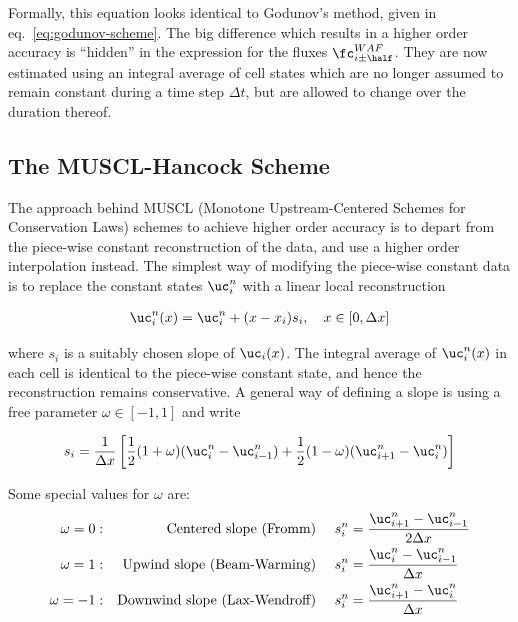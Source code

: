 Formally, this equation looks identical to Godunov's method, given in eq.~\ref{eq:godunov-scheme}.
The big difference which results in a higher order accuracy is ``hidden'' in the expression for the
fluxes $\fc^{WAF}_{i\pm \half}$. They are now estimated using an integral average of cell states
which are no longer assumed to remain constant during a time step $\Delta t$, but are allowed to
change over the duration thereof.






\subsection{The MUSCL-Hancock Scheme}\label{chap:MUSCL-Hancock}


The approach behind MUSCL (Monotone Upstream-Centered Schemes for Conservation Laws) schemes to
achieve higher order accuracy is to depart from the piece-wise constant reconstruction of the data,
and use a higher order interpolation instead. The simplest way of modifying the piece-wise constant
data is to replace the constant states $\uc_i^n$ with a linear local reconstruction

\begin{align}
    \uc_i^n(x) = \uc_i^n + (x - x_i) s_i, \quad x \in [0, \Delta x]
\end{align}

where $s_i$ is a suitably chosen slope of $\uc_i(x)$. The integral average of $\uc_i^n(x)$ in each
cell is identical to the piece-wise constant state, and hence the reconstruction remains
conservative. A general way of defining a slope is using a free parameter $\omega \in [-1, 1]$ and
write

\begin{align}
    s_i = \frac{1}{\Delta x} \left[
    \frac{1}{2} ( 1 + \omega ) (\uc_{i}^n - \uc_{i-1}^n) +
    \frac{1}{2} (1 - \omega)(\uc_{i+1}^n - \uc_{i}^n)
    \right]
\end{align}

Some special values for $\omega$ are:
\begin{align}
    \omega = 0: && \text{Centered slope (Fromm) } &&
        &s_i^n = \frac{\uc_{i+1}^n - \uc_{i-1}^n}{ 2
\Delta x}\\
    \omega = 1: && \text{Upwind slope (Beam-Warming) } &&
        &s_i^n = \frac{\uc_{i}^n - \uc_{i-1}^n}{\Delta x} \\
    \omega = -1: && \text{Downwind slope (Lax-Wendroff) } &&
        &s_i^n = \frac{\uc_{i+1}^n -
\uc_{i}^n}{\Delta x}
\end{align}

